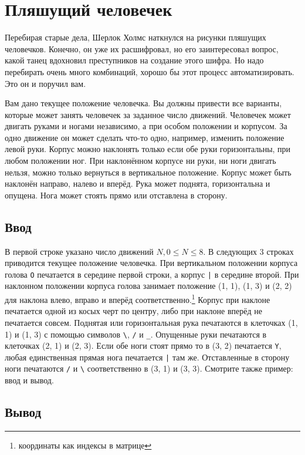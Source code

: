 \documentclass[12pt, oneside]{article}
\begin{document}
\section{Пляшущий человечек}

Перебирая старые дела, Шерлок Холмс наткнулся на рисунки пляшущих человечков. Конечно, 
он уже их расшифровал, но его заинтересовал вопрос, какой танец вдохновил преступников 
на создание этого шифра. Но надо перебирать очень много комбинаций, хорошо бы этот процесс 
автоматизировать. Это он и поручил вам.

Вам дано текущее положение человечка. Вы должны привести все варианты, которые может 
занять человечек за заданное число движений. Человечек может двигать руками и ногами 
независимо, а при особом положении и корпусом. За одно движение он может сделать что-то 
одно, например, изменить положение левой руки. Корпус можно наклонять только если обе руки 
горизонтальны, при любом положении ног. При наклонённом корпусе ни руки, ни ноги двигать 
нельзя, можно только вернуться в вертикальное положение. Корпус может быть наклонён направо, 
налево и вперёд. Рука может поднята, горизонтальна и опущена. Нога может стоять прямо или 
отставлена в сторону.

\subsection*{Ввод}

В первой строке указано число движений $ N, 0\leq{}N\leq{}8 $. В следующих 3 строках 
приводится текущее положение человечка. При вертикальном положении корпуса голова \verb'O' 
печатается в середине первой строки, а корпус \verb'|' в середине второй. При наклонном 
положении корпуса голова занимает положение (1, 1), (1, 3) и (2, 2) для наклона влево, 
вправо и вперёд соответственно.\footnote{координаты как индексы в матрице} Корпус при 
наклоне печатается одной из косых черт по центру, либо при наклоне вперёд не печатается 
совсем. Поднятая или горизонтальная рука печатаются в клеточках (1, 1) и (1, 3) с 
помощью символов \verb'\',  \verb'/' и \verb'_'. Опущенные руки печатаются в клеточках 
(2, 1) и (2, 3). Если обе ноги стоят прямо то в (3, 2) печатается \verb'Y', любая 
единственная прямая нога печатается \verb'|' там же. Отставленные в сторону ноги печатаются  
\verb'/' и \verb'\' соответственно в (3, 1) и (3, 3). Смотрите также пример: ввод и вывод.

\subsection*{Вывод}
\end{document}
